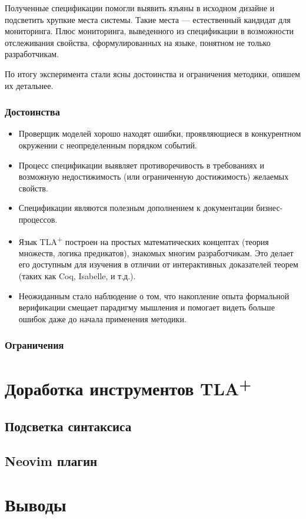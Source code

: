 \documentclass[14pt, openany]{book}
\newcommand{\tlapl}{TLA\textsuperscript{+} }
\begin{document}
Полученные спецификации помогли выявить язъяны в исходном дизайне и подсветить хрупкие места системы. Такие места --- естественный кандидат для мониторинга. Плюс мониторинга, выведенного из спецификации в возможности отслеживания свойства, сформулированных на языке, понятном не только разработчикам.

По итогу эксперимента стали ясны достоинства и ограничения методики, опишем их детальнее.

\subsection{Достоинства}
\begin{itemize}
  \item Проверщик моделей хорошо находят ошибки, проявляющиеся в конкурентном окружении с неопределенным порядком событий.
  \item Процесс спецификации выявляет противоречивость в требованиях и возможную недостижимость (или ограниченную достижимость) желаемых свойств.
  \item Спецификации являются полезным дополнением к документации бизнес-процессов.
  \item Язык \tlapl построен на простых математических концептах (теория множеств, логика предикатов), знакомых многим разработчикам. Это делает его доступным для изучения в отличии от интерактивных доказателей теорем (таких как Coq, Isabelle, и т.д.).
  \item Неожиданным стало наблюдение о том, что накопление опыта формальной верификации смещает парадигму мышления и помогает видеть больше ошибок даже до начала применения методики.
\end{itemize}



\subsection{Ограничения}

\chapter{Доработка инструментов \tlapl}

\section{Подсветка синтаксиса}

\section{Neovim плагин}

\chapter{Выводы}



\end{document}
